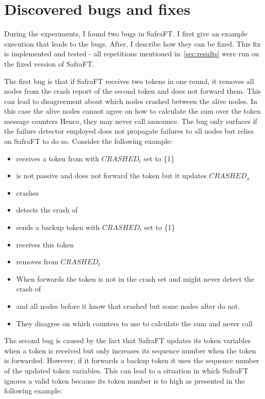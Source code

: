 \section{Discovered bugs and fixes}
\label{sec:safraBugs}

During the experiments, I found two bugs in SafraFT.
I first give an example execution that leads to the bugs.
After, I describe how they can be fixed.
This fix is implemented and tested - all repetitions mentioned in~\cref{sec:results} were run on the fixed version of SafraFT.

The first bug is that if SafraFT receives two tokens in one round, it removes all nodes from the crash report of the second token and does not forward them.
This can lead to disagreement about which nodes crashed between the alive nodes.
In this case the alive nodes cannot agree on how to calculate the sum over the token message counters
Hence, they may never call announce.
The bug only surfaces if the failure detector employed does not propagate failures to all nodes but relies on SafraFT to do so.
Consider the following example:

\begin{itemize}
    \item {} receives a token from  with $CRASHED_t$ set to \{1\}
    \item {} is not passive and does not forward the token but it updates $CRASHED_x$
    \item {} crashes
    \item {} detects the crash of 
    \item {} sends a backup token with $CRASHED_t$ set to \{1\}
    \item {} receives this token
    \item {} removes  from $CRASHED_t$
    \item When  forwards the token  is not in the crash set and  might never detect the crash of 
    \item {} and all nodes before it know that  crashed but some nodes after  do not.
    \item They disagree on which counters to use to calculate the sum and never call 
\end{itemize}

The second bug is caused by the fact that SafraFT updates its token variables when a token is received but only increases its sequence number when the token is forwarded.
However, if it forwards a backup token it uses the sequence number of the updated token variables.
This can lead to a situation in which SafraFT ignores a valid token because its token number is to high as presented in the following example:

